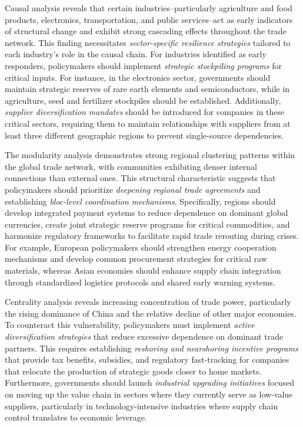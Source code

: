 \documentclass[preprint, 3p,
authoryear]{elsarticle} %
\begin{document}
Causal analysis reveals that certain industries--particularly
agriculture and food products, electronics, transportation, and public
services--act as early indicators of structural change and exhibit
strong cascading effects throughout the trade network. This finding
necessitates \emph{sector-specific resilience strategies} tailored to
each industry's role in the causal chain. For industries identified as
early responders, policymakers should implement \emph{strategic
stockpiling programs} for critical inputs. For instance, in the
electronics sector, governments should maintain strategic reserves of
rare earth elements and semiconductors, while in agriculture, seed and
fertilizer stockpiles should be established. Additionally,
\emph{supplier diversification mandates} should be introduced for
companies in these critical sectors, requiring them to maintain
relationships with suppliers from at least three different geographic
regions to prevent single-source dependencies.

The modularity analysis demonstrates strong regional clustering patterns
within the global trade network, with communities exhibiting denser
internal connections than external ones. This structural characteristic
suggests that policymakers should prioritize \emph{deepening regional
trade agreements} and establishing \emph{bloc-level coordination
mechanisms}. Specifically, regions should develop integrated payment
systems to reduce dependence on dominant global currencies, create joint
strategic reserve programs for critical commodities, and harmonize
regulatory frameworks to facilitate rapid trade rerouting during crises.
For example, European policymakers should strengthen energy cooperation
mechanisms and develop common procurement strategies for critical raw
materials, whereas Asian economies should enhance supply chain
integration through standardized logistics protocols and shared early
warning systems.

Centrality analysis reveals increasing concentration of trade power,
particularly the rising dominance of China and the relative decline of
other major economies. To counteract this vulnerability, policymakers
must implement \emph{active diversification strategies} that reduce
excessive dependence on dominant trade partners. This requires
establishing \emph{reshoring and nearshoring incentive programs} that
provide tax benefits, subsidies, and regulatory fast-tracking for
companies that relocate the production of strategic goods closer to home
markets. Furthermore, governments should launch \emph{industrial
upgrading initiatives} focused on moving up the value chain in sectors
where they currently serve as low-value suppliers, particularly in
technology-intensive industries where supply chain control translates to
economic leverage.
\end{document}
